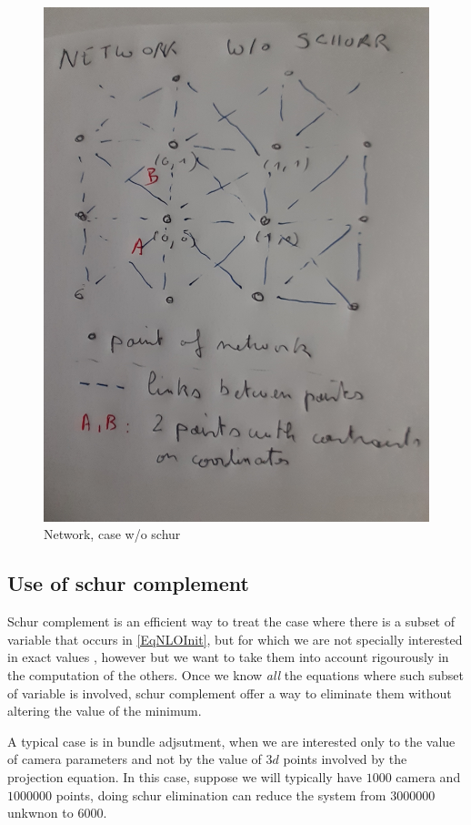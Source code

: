 \begin{figure}
\centering
\includegraphics[width=12cm]{Methods/Images/T90-NetFull.JPG}\caption{Network, case w/o schur}\label{fig:NetFull}
\end{figure}




\subsection{Use of schur complement}

Schur complement is an efficient way to treat the case where there is a subset of variable that 
occurs in \ref{EqNLOInit}, but for which we are not specially interested in exact values ,
 however but we want to take them into account rigourously in 
the computation of the others. Once we know
\emph{all} the equations where such  subset of variable is involved, schur
complement offer a way to eliminate them without altering the value of the minimum.

A typical case is in bundle adjsutment, when we are interested only to the value
of camera parameters and not by the value of $3d$ points involved by the projection
equation. In this case, suppose we will typically  have $1000$ camera and $1000000$ points,
doing schur elimination can reduce the system from $3000000$ unkwnon to $6000$.



